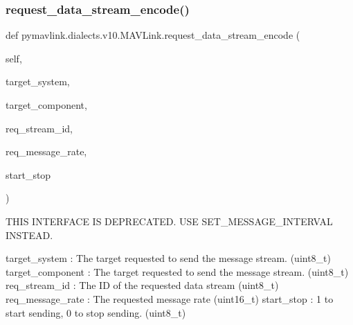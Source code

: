 \begin{DoxyVerb}
\begin{DoxyVerb}
\begin{DoxyVerb}
\begin{DoxyVerb}
\begin{DoxyVerb}
\begin{DoxyVerb}
\begin{DoxyVerb}
\begin{DoxyVerb}
\begin{DoxyVerb}
\begin{DoxyVerb}
\subsubsection{\texorpdfstring{request\+\_\+data\+\_\+stream\+\_\+encode()}{request\_data\_stream\_encode()}}
{\footnotesize\ttfamily def pymavlink.\+dialects.\+v10.\+M\+A\+V\+Link.\+request\+\_\+data\+\_\+stream\+\_\+encode (\begin{DoxyParamCaption}\item[{}]{self,  }\item[{}]{target\+\_\+system,  }\item[{}]{target\+\_\+component,  }\item[{}]{req\+\_\+stream\+\_\+id,  }\item[{}]{req\+\_\+message\+\_\+rate,  }\item[{}]{start\+\_\+stop }\end{DoxyParamCaption})}

\begin{DoxyVerb}THIS INTERFACE IS DEPRECATED. USE SET_MESSAGE_INTERVAL INSTEAD.

target_system             : The target requested to send the message stream. (uint8_t)
target_component          : The target requested to send the message stream. (uint8_t)
req_stream_id             : The ID of the requested data stream (uint8_t)
req_message_rate          : The requested message rate (uint16_t)
start_stop                : 1 to start sending, 0 to stop sending. (uint8_t)\end{DoxyVerb}
 \mbox{\label{classpymavlink_1_1dialects_1_1v10_1_1MAVLink_a3cb280ef30de5b5b3d22b3bf10b43d15}} 

\end{DoxyVerb}
\end{DoxyVerb}
\end{DoxyVerb}
\end{DoxyVerb}
\end{DoxyVerb}
\end{DoxyVerb}
\end{DoxyVerb}
\end{DoxyVerb}
\end{DoxyVerb}
\end{DoxyVerb}
